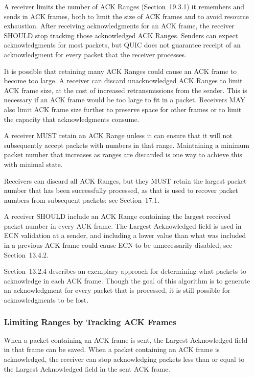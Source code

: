 \documentclass{article}
\begin{document}
A receiver limits the number of ACK Ranges (Section~19.3.1) it remembers and sends in ACK frames, both to limit the size of ACK frames and to avoid resource exhaustion.  After receiving acknowledgments for an ACK frame, the receiver SHOULD stop tracking those acknowledged ACK Ranges.  Senders can expect acknowledgments for most packets, but QUIC does not guarantee receipt of an acknowledgment for every packet that the receiver processes.

It is possible that retaining many ACK Ranges could cause an ACK frame to become too large.  A receiver can discard unacknowledged ACK Ranges to limit ACK frame size, at the cost of increased retransmissions from the sender.  This is necessary if an ACK frame would be too large to fit in a packet.  Receivers MAY also limit ACK frame size further to preserve space for other frames or to limit the capacity that acknowledgments consume.

A receiver MUST retain an ACK Range unless it can ensure that it will not subsequently accept packets with numbers in that range. Maintaining a minimum packet number that increases as ranges are discarded is one way to achieve this with minimal state.

Receivers can discard all ACK Ranges, but they MUST retain the largest packet number that has been successfully processed, as that is used to recover packet numbers from subsequent packets; see Section~17.1.

A receiver SHOULD include an ACK Range containing the largest received packet number in every ACK frame.  The Largest Acknowledged field is used in ECN validation at a sender, and including a lower value than what was included in a previous ACK frame could cause ECN to be unnecessarily disabled; see Section~13.4.2.

Section~13.2.4 describes an exemplary approach for determining what packets to acknowledge in each ACK frame.  Though the goal of this algorithm is to generate an acknowledgment for every packet that is processed, it is still possible for acknowledgments to be lost.

\subsubsection{Limiting Ranges by Tracking ACK Frames}

When a packet containing an ACK frame is sent, the Largest Acknowledged field in that frame can be saved.  When a packet containing an ACK frame is acknowledged, the receiver can stop acknowledging packets less than or equal to the Largest Acknowledged field in the sent ACK frame.
\end{document}
